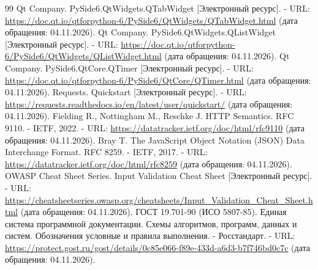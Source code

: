 \begin{thebibliography}{99}
 Qt Company. PySide6.QtWidgets.QTabWidget [Электронный ресурс]. - URL: \url{https://doc.qt.io/qtforpython-6/PySide6/QtWidgets/QTabWidget.html} (дата обращения: 04.11.2026).
 Qt Company. PySide6.QtWidgets.QListWidget [Электронный ресурс]. - URL: \url{https://doc.qt.io/qtforpython-6/PySide6/QtWidgets/QListWidget.html} (дата обращения: 04.11.2026).
 Qt Company. PySide6.QtCore.QTimer [Электронный ресурс]. - URL: \url{https://doc.qt.io/qtforpython-6/PySide6/QtCore/QTimer.html} (дата обращения: 04.11.2026).
 Requests. Quickstart [Электронный ресурс]. - URL: \url{https://requests.readthedocs.io/en/latest/user/quickstart/} (дата обращения: 04.11.2026).
 Fielding R., Nottingham M., Reschke J. HTTP Semantics. RFC 9110. - IETF, 2022. - URL: \url{https://datatracker.ietf.org/doc/html/rfc9110} (дата обращения: 04.11.2026).
 Bray T. The JavaScript Object Notation (JSON) Data Interchange Format. RFC 8259. - IETF, 2017. - URL: \url{https://datatracker.ietf.org/doc/html/rfc8259} (дата обращения: 04.11.2026).
 OWASP Cheat Sheet Series. Input Validation Cheat Sheet [Электронный ресурс]. - URL: \url{https://cheatsheetseries.owasp.org/cheatsheets/Input_Validation_Cheat_Sheet.html} (дата обращения: 04.11.2026).
 ГОСТ 19.701-90 (ИСО 5807-85). Единая система программной документации. Схемы алгоритмов, программ, данных и систем. Обозначения условные и правила выполнения. - Росстандарт. - URL: \url{https://protect.gost.ru/gost/details/0c85e066-f89e-433d-a6d3-b7f746bd0c7c} (дата обращения: 04.11.2026).
\end{thebibliography}
\endgroup
